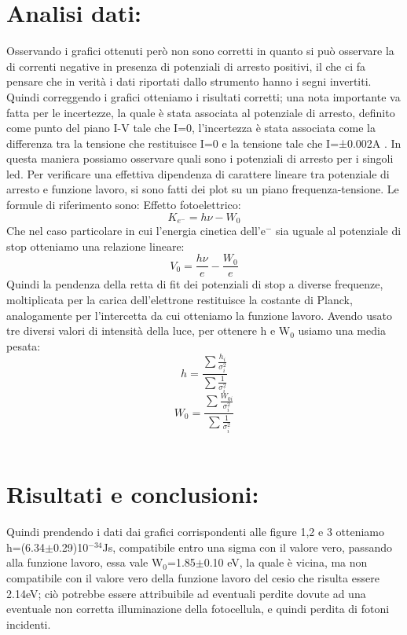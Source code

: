 \documentclass{article}
\begin{document}
\section{Analisi dati:}
Osservando i grafici ottenuti però non sono corretti in quanto si può osservare la di correnti negative in presenza di potenziali di arresto positivi, il che ci fa pensare che in verità i dati riportati dallo strumento hanno i segni invertiti. Quindi correggendo i grafici otteniamo i risultati corretti; una nota importante va fatta per le incertezze, la quale è stata associata al potenziale di arresto, definito come punto del piano I-V tale che I=0, l'incertezza è stata associata come la differenza tra la tensione che restituisce I=0 e la tensione tale che I=±0.002A . In questa maniera possiamo osservare quali sono i potenziali di arresto per i singoli led. Per verificare una effettiva dipendenza di carattere lineare tra potenziale di arresto e funzione lavoro, si sono fatti dei plot su un piano frequenza-tensione. Le formule di riferimento sono:
Effetto fotoelettrico:
\begin{equation}
    K_{e^{-}}=h\nu-W_{0}
\end{equation}
Che nel caso particolare in cui l'energia cinetica dell'e$^{-}$ sia uguale al potenziale di stop otteniamo una relazione lineare:
\begin{equation}
    V_{0}=\frac{h\nu}{e}-\frac{W_{0}}{e}
\end{equation}
Quindi la pendenza della retta di fit dei potenziali di stop a diverse frequenze, moltiplicata per la carica dell'elettrone restituisce la costante di Planck, analogamente per l'intercetta da cui otteniamo la funzione lavoro.
Avendo usato tre diversi valori di intensità della luce, per ottenere h e W$_{0}$ usiamo una media pesata:
\begin{equation}
    h=\frac{\sum\frac{h_{i}}{\sigma_{i}^2}}{\sum\frac{1}{\sigma_{i}^2}}
\end{equation}
\begin{equation}
    W_{0}=\frac{\sum\frac{W_{0i}}{\sigma_{i}^2}}{\sum\frac{1}{\sigma_{i}^2}}
\end{equation}
~
\section{Risultati e conclusioni:}
Quindi prendendo i dati dai grafici corrispondenti alle figure 1,2 e 3 otteniamo h=(6.34$\pm$0.29)10$^{-34}$Js, compatibile entro una sigma con il valore vero, passando alla funzione lavoro, essa vale W$_{0}$=1.85$\pm$0.10 eV, la quale è vicina, ma non compatibile con il valore vero della funzione lavoro del cesio che risulta essere 2.14eV; ciò potrebbe essere attribuibile ad eventuali perdite dovute ad una eventuale non corretta illuminazione della fotocellula, e quindi perdita di fotoni incidenti.
~
\end{document}
